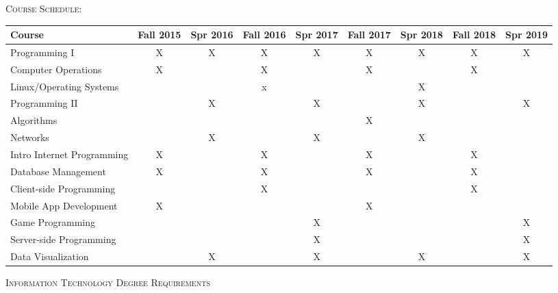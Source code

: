 \documentclass[letterpaper,10pt]{article}
\begin{document}
\begin{center}
\end{center}

\bigskip



{\scshape  \Large Course Schedule:}\\[5pt]
\setlength{\extrarowheight}{3pt}
\begin{tabular}{ l | c | c | c |c |c |c |c |c |}
Course & Fall 2015 & Spr 2016 & Fall 2016 & Spr 2017 & Fall 2017 & Spr 2018 & Fall 2018 & Spr 2019\\
\hline
\hline
Programming I             & X & X & X & X & X & X & X & X\\
Computer Operations       & X &   & X &  & X &  & X &  \\
Linux/Operating Systems   &  &  & x &  & & X & &   \\
Programming II            &  & X &  & X & & X & & X  \\
Algorithms                & &  & & & X &  & &  \\
Networks                  & & X & & X & & X & &   \\
Intro Internet Programming & X & & X & & X & & X & \\
Database Management       & X & & X & & X &  & X &  \\
Client-side Programming   & & & X & & & & X &  \\
\hline
Mobile App Development     &X & &  & & X & &  &  \\
Game Programming          & & &  & X & & &  & X  \\
Server-side Programming   & & & & X & & & & X \\
Data Visualization        & & X & & X & & X & & X \\
\hline
\end{tabular}


\vspace{20pt}
{\scshape \Large Information Technology Degree Requirements}\\
\end{document}
